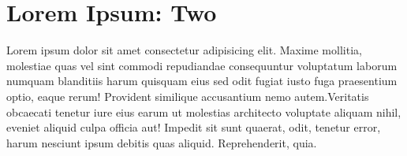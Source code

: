 \section{Lorem Ipsum: Two} \label{ch-template}

Lorem ipsum dolor sit amet consectetur adipisicing elit. Maxime mollitia,
molestiae quas vel sint commodi repudiandae consequuntur voluptatum laborum\citep{Fil09}
numquam blanditiis harum quisquam eius sed odit fugiat iusto fuga praesentium
optio, eaque rerum! Provident similique accusantium nemo autem.Veritatis
obcaecati tenetur iure eius earum ut molestias architecto voluptate aliquam
nihil, eveniet aliquid culpa officia aut! Impedit sit sunt quaerat, odit,
tenetur error, harum nesciunt ipsum debitis quas aliquid. Reprehenderit,
quia.